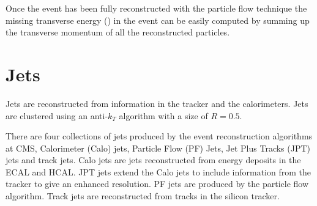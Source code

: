 Once the event has been fully reconstructed with the particle flow technique
the missing transverse energy (\ETm) in the event can be easily computed by
summing up the transverse momentum of all the reconstructed particles.\cite{PF}

\section{Jets}
Jets are reconstructed from information in the tracker and the calorimeters.
Jets are clustered using an anti-$k_T$ algorithm  with a size of
$R=0.5$.

There are four collections of jets produced by the event reconstruction
algorithms at CMS, Calorimeter (Calo) jets, Particle Flow (PF) Jets, Jet Plus
Tracks (JPT) jets and track jets. Calo jets are jets reconstructed from energy
deposits in the ECAL and HCAL. JPT jets extend the Calo jets to include
information from the tracker to give an enhanced \pT resolution. PF jets are
produced by the particle flow algorithm\cite{PF}. Track jets are reconstructed from
tracks in the silicon tracker.

